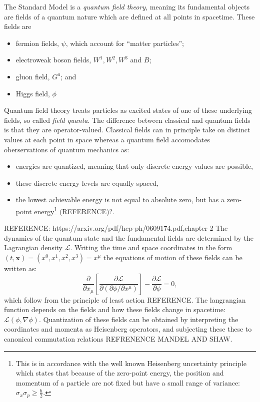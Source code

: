 The Standard Model is a \textit{quantum field theory}, meaning its fundamental objects are fields of a quantum nature which are defined at all points in spacetime. These fields are
\begin{itemize}
\item fermion fields, $\psi$, which account for ``matter particles'';
\item electroweak boson fields, $W^1, W^2, W^3$ and $B$;
\item gluon field, $G^a$; and
\item Higgs field, $\phi$
\end{itemize}
Quantum field theory treats particles as excited states of one of these underlying fields, so called \textit{field quanta}. The difference between classical and quantum fields is that they are operator-valued. Classical fields can in principle take on distinct values at each point in space whereas a quantum field accomodates oberservations of quantum mechanics as:
\begin{itemize}
\item energies are quantized, meaning that only discrete energy values are possible,
\item these discrete energy levels are equally spaced,
\item the lowest achievable energy is not equal to absolute zero, but has a zero-point energy\footnote{This is in accordance with the well known Heisenberg uncertainty principle which states that because of the zero-point energy, the position and momentum of a particle are not fixed but have a small range of variance: $\sigma_x\sigma_p \geq \frac{\hbar }{2}$.} (REFERENCE)?.
\end{itemize}

REFERENCE: https://arxiv.org/pdf/hep-ph/0609174.pdf,chapter 2
The dynamics of the quantum state and the fundamental fields are determined by the Lagrangian density $\mathcal{L}$. Writing the time and space coordinates in the form $(t,\mathbf{x}) = (x^0, x^1, x^2, x^3) = x^\mu$ the equations of motion of these fields can be written as:
\begin{equation}
\frac{\partial}{\partial x_{\mu}}\left[\frac{\partial \mathcal{L}}{\partial\left(\partial\phi/\partial x^{\mu}\right)}\right] - \frac{\partial \mathcal{L}}{\partial \phi} = 0,
\end{equation}
which follow from the principle of least action REFERENCE. The langrangian function depends on the fields and how these fields change in spacetime: $\mathcal{L(\phi,\nabla\phi)}$. Quantization of these fields can be obtained by interpreting the coordinates and momenta as Heisenberg operators, and subjecting these these to canonical commutation relations REFRENENCE MANDEL AND SHAW. 

